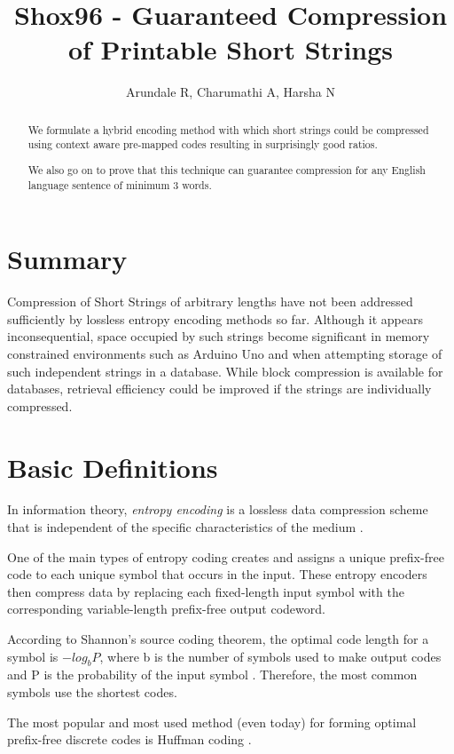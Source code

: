 \documentclass[]{article}
\title{Shox96 - Guaranteed Compression of Printable Short Strings}
\author{Arundale R, Charumathi A, Harsha N}
\begin{document}
\maketitle

\begin{abstract}
We formulate a hybrid encoding method with which short strings could be compressed using context aware pre-mapped codes resulting in surprisingly good ratios.

We also go on to prove that this technique can guarantee compression for any English language sentence of minimum 3 words.
\end{abstract}

\section{Summary}

Compression of Short Strings of arbitrary lengths have not been addressed sufficiently by lossless entropy encoding methods so far.  Although it appears inconsequential, space occupied by such strings become significant in memory constrained environments such as Arduino Uno and when attempting storage of such independent strings in a database. While block compression is available for databases, retrieval efficiency could be improved if the strings are individually compressed.

\section{Basic Definitions}

In information theory, \emph{entropy encoding} is a lossless data compression scheme that is independent of the specific characteristics of the medium \cite{1}.

One of the main types of entropy coding creates and assigns a unique prefix-free code to each unique symbol that occurs in the input. These entropy encoders then compress data by replacing each fixed-length input symbol with the corresponding variable-length prefix-free output codeword.

According to Shannon's source coding theorem, the optimal code length for a symbol is $-log_bP$, where b is the number of symbols used to make output codes and P is the probability of the input symbol \cite{2}. Therefore, the most common symbols use the shortest codes.

The most popular and most used method (even today) for forming optimal prefix-free discrete codes is Huffman coding \cite{3}.
\end{document}
